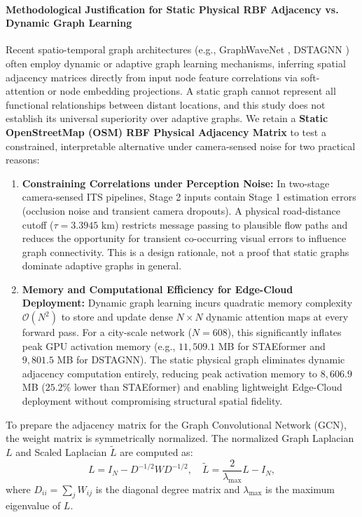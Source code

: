 \documentclass[journal,twocolumn]{IEEEtran}
\begin{document}
\paragraph{Methodological Justification for Static Physical RBF Adjacency vs. Dynamic Graph Learning}
Recent spatio-temporal graph architectures (e.g., GraphWaveNet \cite{wavenet}, DSTAGNN \cite{dstagnn}) often employ dynamic or adaptive graph learning mechanisms, inferring spatial adjacency matrices directly from input node feature correlations via soft-attention or node embedding projections. A static graph cannot represent all functional relationships between distant locations, and this study does not establish its universal superiority over adaptive graphs. We retain a \textbf{Static OpenStreetMap (OSM) RBF Physical Adjacency Matrix} to test a constrained, interpretable alternative under camera-sensed noise for two practical reasons:
\begin{enumerate}
    \item \textbf{Constraining Correlations under Perception Noise:} In two-stage camera-sensed ITS pipelines, Stage 2 inputs contain Stage 1 estimation errors (occlusion noise and transient camera dropouts). A physical road-distance cutoff ($\tau = 3.3945$ km) restricts message passing to plausible flow paths and reduces the opportunity for transient co-occurring visual errors to influence graph connectivity. This is a design rationale, not a proof that static graphs dominate adaptive graphs in general.
    \item \textbf{Memory and Computational Efficiency for Edge-Cloud Deployment:} Dynamic graph learning incurs quadratic memory complexity $\mathcal{O}(N^2)$ to store and update dense $N \times N$ dynamic attention maps at every forward pass. For a city-scale network ($N=608$), this significantly inflates peak GPU activation memory (e.g., $11,509.1$ MB for STAEformer and $9,801.5$ MB for DSTAGNN). The static physical graph eliminates dynamic adjacency computation entirely, reducing peak activation memory to $8,606.9$ MB ($25.2\%$ lower than STAEformer) and enabling lightweight Edge-Cloud deployment without compromising structural spatial fidelity.
\end{enumerate}

To prepare the adjacency matrix for the Graph Convolutional Network (GCN), the weight matrix is symmetrically normalized. The normalized Graph Laplacian $L$ and Scaled Laplacian $\tilde{L}$ are computed as:
\begin{equation}
L = I_N - D^{-1/2} W D^{-1/2}, \quad \tilde{L} = \frac{2}{\lambda_{\max}} L - I_N,
\end{equation}
where $D_{ii} = \sum_{j} W_{ij}$ is the diagonal degree matrix and $\lambda_{\max}$ is the maximum eigenvalue of $L$.
\end{document}
